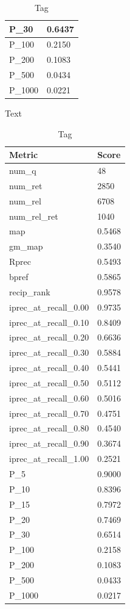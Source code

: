 \begin{table}[htb]
{\begin{tabular}{ | l | l | }
	P\_30 & 0.6437 \\ \hline
	P\_100 & 0.2150 \\ \hline
	P\_200 & 0.1083 \\ \hline
	P\_500 & 0.0434 \\ \hline
	P\_1000 & 0.0221 \\ \hline
    \end{tabular}
    \caption{Text}
    \label{table:manual-text}
    }
    \hfill
    \parbox{.45\linewidth}{
    \begin{tabular}{ | l | l | }
    \hline
    Metric & Score \\ \hline
	num\_q & 48 \\ \hline
	num\_ret & 2850 \\ \hline
	num\_rel & 6708 \\ \hline
	num\_rel\_ret & 1040 \\ \hline
	map & 0.5468 \\ \hline
	gm\_map & 0.3540 \\ \hline
	Rprec & 0.5493 \\ \hline
	bpref & 0.5865 \\ \hline
	recip\_rank & 0.9578 \\ \hline
	iprec\_at\_recall\_0.00 & 0.9735 \\ \hline
	iprec\_at\_recall\_0.10 & 0.8409 \\ \hline
	iprec\_at\_recall\_0.20 & 0.6636 \\ \hline
	iprec\_at\_recall\_0.30 & 0.5884 \\ \hline
	iprec\_at\_recall\_0.40 & 0.5441 \\ \hline
	iprec\_at\_recall\_0.50 & 0.5112 \\ \hline
	iprec\_at\_recall\_0.60 & 0.5016 \\ \hline
	iprec\_at\_recall\_0.70 & 0.4751 \\ \hline
	iprec\_at\_recall\_0.80 & 0.4540 \\ \hline
	iprec\_at\_recall\_0.90 & 0.3674 \\ \hline
	iprec\_at\_recall\_1.00 & 0.2521 \\ \hline
	P\_5 & 0.9000 \\ \hline
	P\_10 & 0.8396 \\ \hline
	P\_15 & 0.7972 \\ \hline
	P\_20 & 0.7469 \\ \hline
	P\_30 & 0.6514 \\ \hline
	P\_100 & 0.2158 \\ \hline
	P\_200 & 0.1083 \\ \hline
	P\_500 & 0.0433 \\ \hline
	P\_1000 & 0.0217 \\ \hline
    \end{tabular}
    \caption{Tag}
    \label{table:manual-tag}
    }
\end{table}

